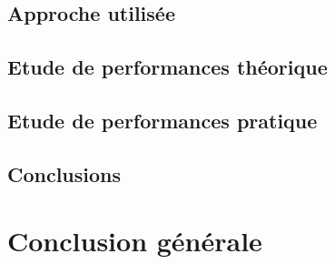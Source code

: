 \documentclass[11pt,a4paper]{article}
\begin{document}
	\subsection{Approche utilisée}
	\subsection{Etude de performances théorique}
	\subsection{Etude de performances pratique}
	\subsection{Conclusions}

\section{Conclusion générale}



% 
% 

%
\end{document}
